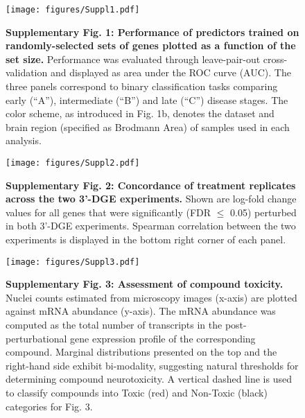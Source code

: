 \documentclass{article}
\begin{document}

\begin{figure}
  \begin{center}
    \texttt{[image: figures/Suppl1.pdf]}
  \end{center}
  \caption*{\textbf{Supplementary Fig. 1: Performance of predictors trained on randomly-selected sets of genes plotted as a function of the set size.} Performance was evaluated through leave-pair-out cross-validation and displayed as area under the ROC curve (AUC). The three panels correspond to binary classification tasks comparing early (“A”), intermediate (“B”) and late (“C”) disease stages. The color scheme, as introduced in Fig. 1b, denotes the dataset and brain region (specified as Brodmann Area) of samples used in each analysis.}
\end{figure}


\begin{figure}
  \begin{center}
    \texttt{[image: figures/Suppl2.pdf]}
  \end{center}
\caption*{\textbf{Supplementary Fig. 2: Concordance of treatment replicates across the two 3’-DGE experiments.} Shown are log-fold change values for all genes that were significantly (FDR $\leq$ 0.05) perturbed in both 3’-DGE experiments. Spearman correlation between the two experiments is displayed in the bottom right corner of each panel.}
\end{figure}


\begin{figure}
  \begin{center}
    \texttt{[image: figures/Suppl3.pdf]}
  \end{center}
  \caption*{\textbf{Supplementary Fig. 3: Assessment of compound toxicity.} Nuclei counts estimated from microscopy images (x-axis) are plotted against mRNA abundance (y-axis). The mRNA abundance was computed as the total number of transcripts in the post-perturbational gene expression profile of the corresponding compound. Marginal distributions presented on the top and the right-hand side exhibit bi-modality, suggesting natural thresholds for determining compound neurotoxicity. A vertical dashed line is used to classify compounds into Toxic (red) and Non-Toxic (black) categories for Fig. 3.}
\end{figure}
\end{document}
